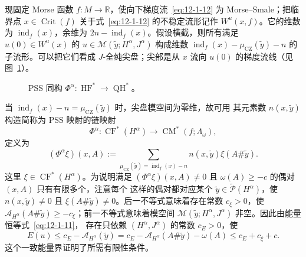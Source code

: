 现固定 Morse 函数 $f:M\to\mathbb R$，使向下梯度流~\eqref{eq:12-1-12} 为
Morse--Smale；把临界点 $x\in\operatorname{Crit}(f)$
关于式~\eqref{eq:12-1-12} 的不稳定流形记作 $W^u(x,f)$。它的维数为
$\operatorname{ind}_f(x)$，余维为 $2n-\operatorname{ind}_f(x)$。假设横截，则所有满足
$u(0)\in W^u(x)$ 的 $u\in\mathcal M(\widetilde y;H^\alpha,J^\alpha)$ 构成维数
$\operatorname{ind}_f(x)-\mu_{\mathrm{CZ}}(\widetilde y)-n$ 的子流形。可以把它们看成
$J$-全纯尖盘；尖部是从 $x$ 流向 $u(0)$ 的梯度流线（见图~\ref{fig:12-1-1}）。

\begin{figure}[tbp]
\centering
{}
\caption{PSS 同构 $\Phi^\alpha:\operatorname{HF}^*\to\operatorname{QH}^*$。}
\label{fig:12-1-1}
\end{figure}

当 $\operatorname{ind}_f(x)-n=\mu_{\mathrm{CZ}}(\widetilde y)$ 时，尖盘模空间为零维，故可用
其元素数 $n(x,\widetilde y)$ 构造简称为 PSS 映射的链映射
\[
  \Phi^\alpha:\operatorname{CF}^*(H^\alpha)
  \longrightarrow\operatorname{CM}^*(f;\Lambda_\omega),
\]
定义为
\[
  (\Phi^\alpha\xi)(x,A):=
  \sum_{\mu_{\mathrm{CZ}}(\widetilde y)=\operatorname{ind}_f(x)-n}
  n(x,\widetilde y)\xi(A\#\widetilde y).
\]
这里 $\xi\in\operatorname{CF}^*(H^\alpha)$。为说明满足
$(\Phi^\alpha\xi)(x,A)\neq0$ 且 $\omega(A)\geq-c$ 的偶对 $(x,A)$ 只有有限多个，注意每个
这样的偶对都对应某个 $\widetilde y\in\widetilde{\mathcal P}(H^\alpha)$，使
$n(x,\widetilde y)\neq0$ 且 $\xi(A\#\widetilde y)\neq0$。后一不等式意味着存在常数
$c_\xi>0$，使 $\mathcal A_{H^\alpha}(A\#\widetilde y)\geq-c_\xi$；前一不等式意味着模空间
$\mathcal M(\widetilde y;H^\alpha,J^\alpha)$ 非空。因此由能量恒等式~\eqref{eq:12-1-11}，
存在只依赖 $(H^\alpha,J^\alpha)$ 的常数 $c_E>0$，使
\begin{equation}\label{eq:12-1-14}
  E(u)\leq c_E-\mathcal A_{H^\alpha}(\widetilde y)
  =c_E-\mathcal A_{H^\alpha}(A\#\widetilde y)-\omega(A)
  \leq c_E+c_\xi+c.
\end{equation}
这个一致能量界证明了所需有限性条件。

